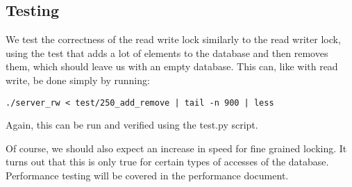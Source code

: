 \documentclass[paper=a4, fontsize=11pt]{scrartcl} %
\numberwithin{equation}{section} %
\numberwithin{figure}{section} %
\numberwithin{table}{section} %
\begin{document}
\subsection{Testing}
We test the correctness of the read write lock similarly to the read writer lock, using the test that adds a lot of elements to the database and then removes them, which should leave us with an empty database. This can, like with read write, be done simply by running:

\begin{verbatim}
./server_rw < test/250_add_remove | tail -n 900 | less
\end{verbatim}

Again, this can be run and verified using the test.py script.

Of course, we should also expect an increase in speed for fine grained locking.  It turns out that this is only true for certain types of accesses of the database. Performance testing will be covered in the performance document.
\end{document}
